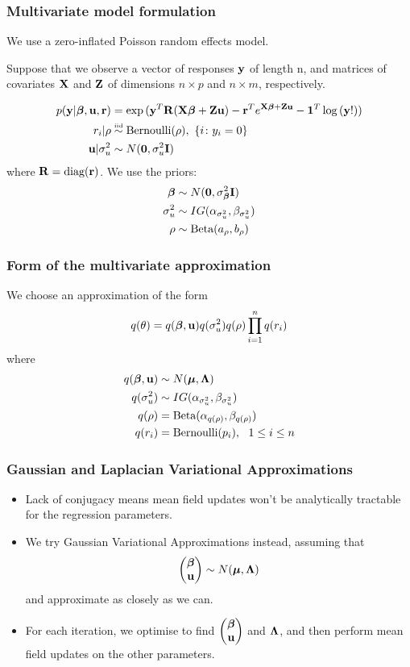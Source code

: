 \documentclass{beamer}
\begin{document}
\begin{frame}
\frametitle{Multivariate model formulation}
We use a zero-inflated Poisson random effects model.

\medskip

Suppose that we observe a vector of responses ${\bf y}$ of length n, and matrices
of covariates ${\bf X}$ and ${\bf Z}$ of dimensions $n \times p$ and $n \times m$,
respectively.

\begin{align*}
p({\bf y}|{\boldsymbol \beta}, {\bf u}, {\bf r}) &= \exp{({\bf y}^T{\bf R}({\bf X}{\boldsymbol\beta}+ {\bf Z}{\bf u}) - {\bf r}^Te^{{\bf X}{\boldsymbol\beta}+ {\bf Z}{\bf u}} - {\bf1}^T\log{({\bf y}!)})} \\
r_i|\rho & \stackrel{\mbox{\tiny iid}}{\sim} \text{Bernoulli}(\rho), \ \{i \colon y_i=0\} \\
{\bf u}|\sigma_u^2 &\sim N({\bf 0}, \sigma_u^2 {\bf I}) \\
\end{align*}
\noindent where ${\bf R} =\mbox{diag}({\bf r})$.
We use the priors:
\begin{align*}
{\boldsymbol\beta} &\sim N({\bf 0}, \sigma_{\boldsymbol \beta}^2{\bf I}) \\
\sigma_u^2 &\sim IG(\alpha_{\sigma_u^2}, \beta_{\sigma_u^2}) \\
\rho &\sim \text{Beta}(a_\rho, b_\rho) \\
\end{align*}
\end{frame}

\begin{frame}
\frametitle{Form of the multivariate approximation}
We choose an approximation of the form
$$
q(\theta) = q({\boldsymbol \beta}, {\bf u}) q(\sigma_u^2) q(\rho) \prod_{i=1}^n q(r_i)
$$
where
\begin{align*}
q({\boldsymbol \beta}, {\bf u}) &\sim N({\boldsymbol \mu}, {\boldsymbol \Lambda}) \\
q(\sigma_u^2) &\sim IG(\alpha_{\sigma_u^2}, \beta_{\sigma_u^2}) \\
q(\rho) &= \text{Beta}(\alpha_{q(\rho)}, \beta_{q(\rho)}) \\
q(r_i) &= \text{Bernoulli}(p_i), \ \ 1 \leq i \leq n
\end{align*}
\end{frame}

\begin{frame}
\frametitle{Gaussian and Laplacian Variational Approximations}
\begin{itemize}
\item Lack of conjugacy means mean field updates won't be analytically tractable for the regression parameters.
\item We try Gaussian Variational Approximations instead, assuming that
$$
\begin{pmatrix}
{\boldsymbol\beta} \\
{\bf u}
\end{pmatrix}
\sim N({\boldsymbol \mu}, {\boldsymbol \Lambda})
$$
and approximate as closely as we can.
\item For each iteration, we optimise to find
$\begin{pmatrix}
{\boldsymbol\beta} \\
{\bf u}
\end{pmatrix}
$ and ${\boldsymbol \Lambda}$,
and then perform mean field updates on the other parameters.
\end{itemize}
\end{frame}
\end{document}
